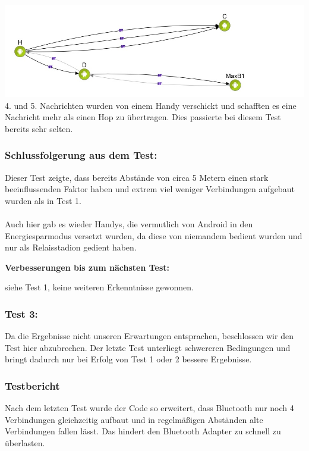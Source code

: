 \includegraphics[width=1.0\textwidth]{belege/grosstests/Bilder/Test2Misserfolg6.jpg}\\ 4. und
5. Nachrichten wurden von einem Handy verschickt und schafften es eine
Nachricht mehr als einen Hop zu übertragen. Dies passierte bei diesem
Test bereits sehr selten.\\

\subsubsection{Schlussfolgerung aus dem
Test:}\label{schlussfolgerung-aus-dem-test-1}

Dieser Test zeigte, dass bereits Abstände von circa 5 Metern einen stark
beeinflussenden Faktor haben und extrem viel weniger Verbindungen
aufgebaut wurden als in Test 1.\\\\

Auch hier gab es wieder Handys, die vermutlich von Android in den
Energiesparmodus versetzt wurden, da diese von niemandem bedient wurden
und nur als Relaisstadion gedient haben.

\textbf{Verbesserungen bis zum nächsten Test:}

siehe Test 1, keine weiteren Erkenntnisse gewonnen.

\subsubsection{Test 3:}\label{test-3}

Da die Ergebnisse nicht unseren Erwartungen entsprachen, beschlossen wir
den Test hier abzubrechen. Der letzte Test unterliegt schwereren
Bedingungen und bringt dadurch nur bei Erfolg von Test 1 oder 2 bessere
Ergebnisse.

\subsubsection{Testbericht}\label{testbericht-1}

Nach dem letzten Test wurde der Code so erweitert, dass Bluetooth nur
noch 4 Verbindungen gleichzeitig aufbaut und in regelmäßigen Abständen
alte Verbindungen fallen lässt. Das hindert den Bluetooth Adapter zu
schnell zu überlasten.\\\\

